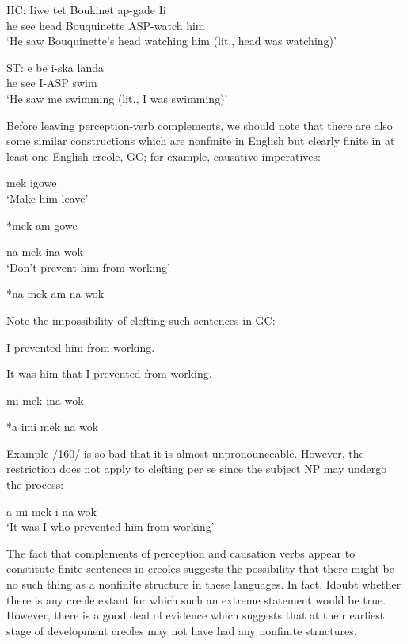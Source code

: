 \ea\label{ex:2:151}
\gll HC: Iiwe tet Boukinet ap-gade Ii\\
he see head Bouquinette ASP-watch him \\
\glt `He saw Bouquinette's head watching him (lit., head was watching)'
\z





\ea\label{ex:2:152}
 \gll ST: e be i-ska landa\\
he see I-ASP swim\\
\glt `He saw me swimming (lit., I was swimming)'
\z





Before leaving perception-verb complements, we should note that there are also some similar constructions which are nonfmite in English but clearly finite in at least one English creole, GC; for example, causative imperatives:

\ea\label{ex:2:153}
 mek igowe\\
\glt `Make him leave'
\z



\ea\label{ex:2:154}
 *mek am gowe \\
\z

\ea\label{ex:2:155}
 na mek ina wok\\
\glt `Don't prevent him from working'
\z




\ea\label{ex:2:156}
 *na mek am na wok\\
\z

Note the impossibility of clefting such sentences in GC:


\ea\label{ex:2:157}
I prevented him from working.
\z

\ea\label{ex:2:158}
 It was him that I prevented from working.
\z

\ea\label{ex:2:159}
 mi mek ina wok
\z

\ea\label{ex:2:160}
 *a imi mek na wok
\z

Example /160/ is so bad that it is almost unpronounceable. However, the restriction does not apply to clefting per se since the subject NP may undergo the process:

\ea\label{ex:2:161}
 a mi mek i na wok\\
\glt `It was I who prevented him from working'
\z



The fact that complements of perception and causation verbs appear to constitute finite sentences in creoles suggests the possibility that there might be no such thing as a nonfinite structure in these languages. In fact, Idoubt whether there is any creole extant for which such an extreme statement would be true. However, there is a good deal of evidence which suggests that at their earliest stage of develop\-ment creoles may not have had any nonfinite strnctures.

